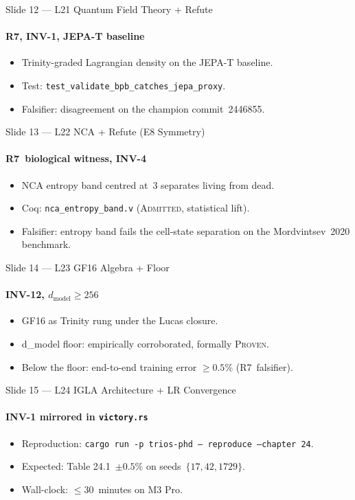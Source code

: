 \documentclass[10pt,aspectratio=169]{beamer}
\begin{document}
\begin{frame}{Slide 12 — L21 Quantum Field Theory + Refute}
  \framesubtitle{R7, INV-1, JEPA-T baseline}
  \begin{itemize}
    \item Trinity-graded Lagrangian density on the JEPA-T baseline.
    \item Test: \texttt{test\_validate\_bpb\_catches\_jepa\_proxy}.
    \item Falsifier: disagreement on the champion commit~2446855.
  \end{itemize}
\end{frame}

\begin{frame}{Slide 13 — L22 NCA + Refute (E8 Symmetry)}
  \framesubtitle{R7~biological witness, INV-4}
  \begin{itemize}
    \item NCA entropy band centred at~3 separates living from dead.
    \item Coq: \texttt{nca\_entropy\_band.v} (\textsc{Admitted},
      statistical lift).
    \item Falsifier: entropy band fails the cell-state separation on the
      Mordvintsev~2020 benchmark.
  \end{itemize}
\end{frame}

\begin{frame}{Slide 14 — L23 GF16 Algebra + Floor}
  \framesubtitle{INV-12, \(d_{\mathrm{model}} \ge 256\)}
  \begin{itemize}
    \item GF16 as Trinity rung under the Lucas closure.
    \item d\_model floor: empirically corroborated, formally \textsc{Proven}.
    \item Below the floor: end-to-end training error \(\ge 0.5\%\)
      (R7~falsifier).
  \end{itemize}
\end{frame}

\begin{frame}{Slide 15 — L24 IGLA Architecture + LR Convergence}
  \framesubtitle{INV-1 mirrored in \texttt{victory.rs}}
  \begin{itemize}
    \item Reproduction:
      \texttt{cargo run -p trios-phd -- reproduce --chapter 24}.
    \item Expected: Table 24.1~\(\pm 0.5\%\) on seeds~\(\{17, 42, 1729\}\).
    \item Wall-clock: \(\le 30\)~minutes on M3 Pro.
  \end{itemize}
\end{frame}
\end{document}

